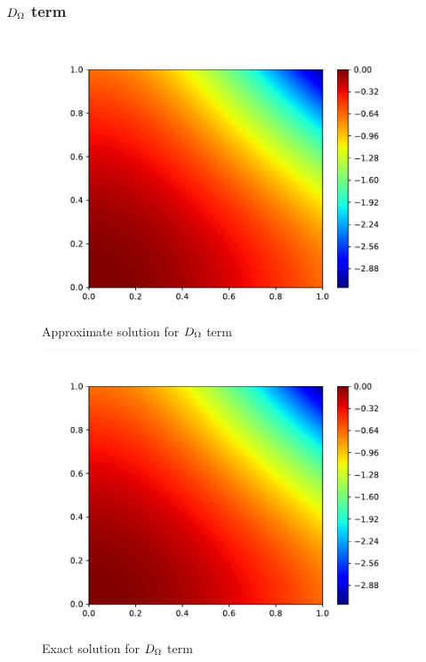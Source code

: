 \subsubsection{$D_{\Omega}$ term}
\begin{figure}[H]
    \includegraphics[height=0.35\textheight]{media/enstrophy-transport-terms/D-term-approx.pdf}
    \caption{Approximate solution for $D_{\Omega}$ term}
    \label{fig:d-approx}
\end{figure}
\begin{figure}[H]
    \includegraphics[height=0.35\textheight]{media/enstrophy-transport-terms/D-term-exact.pdf}
    \caption{Exact solution for $D_{\Omega}$ term}
    \label{fig:d-exact}
\end{figure}

